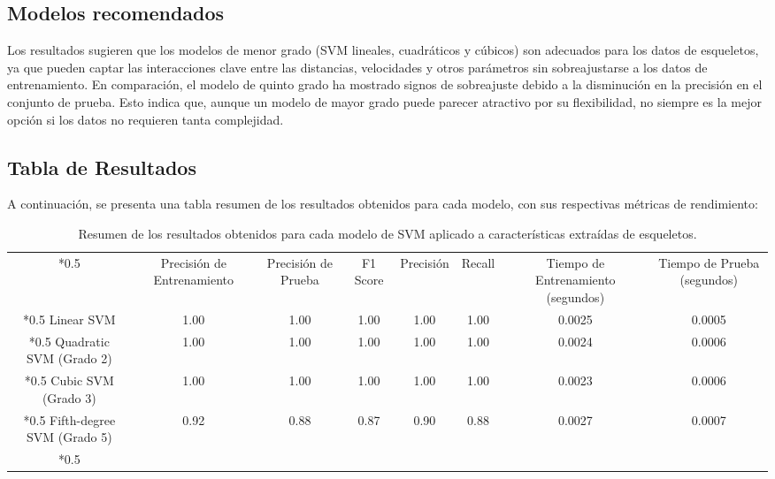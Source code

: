 \subsection{Modelos recomendados}
Los resultados sugieren que los modelos de menor grado (SVM lineales, cuadráticos y cúbicos) son adecuados para los datos de esqueletos, ya que pueden captar las interacciones clave entre las distancias, velocidades y otros parámetros sin sobreajustarse a los datos de entrenamiento. En comparación, el modelo de quinto grado ha mostrado signos de sobreajuste debido a la disminución en la precisión en el conjunto de prueba. Esto indica que, aunque un modelo de mayor grado puede parecer atractivo por su flexibilidad, no siempre es la mejor opción si los datos no requieren tanta complejidad.

\subsection{Tabla de Resultados}

A continuación, se presenta una tabla resumen de los resultados obtenidos para cada modelo, con sus respectivas métricas de rendimiento:

\begin{table}[h!]
\centering
\begin{tabular}{|c|c|c|c|c|c|c|c|}
\hline*0.5
\multirow{2}{*}{Modelo} & \multirow{2}{*}{Precisión de Entrenamiento} & \multirow{2}{*}{Precisión de Prueba} & \multirow{2}{*}{F1 Score} & \multirow{2}{*}{Precisión} & \multirow{2}{*}{Recall} & \multirow{2}{*}{Tiempo de Entrenamiento (segundos)} & \multirow{2}{*}{Tiempo de Prueba (segundos)} \\
& & & & & & & \\
\hline*0.5
Linear SVM & 1.00 & 1.00 & 1.00 & 1.00 & 1.00 & 0.0025 & 0.0005 \\
\hline*0.5
Quadratic SVM (Grado 2) & 1.00 & 1.00 & 1.00 & 1.00 & 1.00 & 0.0024 & 0.0006 \\
\hline*0.5
Cubic SVM (Grado 3) & 1.00 & 1.00 & 1.00 & 1.00 & 1.00 & 0.0023 & 0.0006 \\
\hline*0.5
Fifth-degree SVM (Grado 5) & 0.92 & 0.88 & 0.87 & 0.90 & 0.88 & 0.0027 & 0.0007 \\
\hline*0.5
\end{tabular}
\caption{Resumen de los resultados obtenidos para cada modelo de SVM aplicado a características extraídas de esqueletos.}
\end{table}
